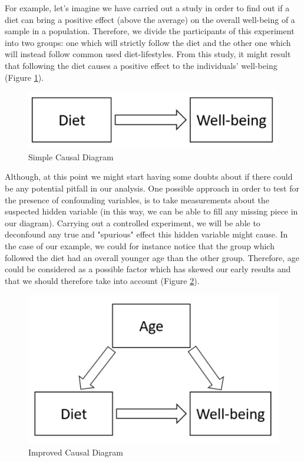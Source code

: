 For example, let's imagine we have carried out a study in order to find out if a diet can bring a positive effect (above the average) on the overall well-being of a sample in a population. Therefore, we divide the participants of this experiment into two groups: one which will strictly follow the diet and the other one which will instead follow common used diet-lifestyles. From this study, it might result that following the diet causes a positive effect to the individuals' well-being (Figure \ref{cex1}).

\begin{figure}[ht!]%
    \centering
    \includegraphics[width=0.4\linewidth]{latex/images/simple_ex.pdf}
    \vspace{-0.2cm}
    \caption{Simple Causal Diagram}
    \label{cex1}
\end{figure}
\vspace{-0.5cm}

Although, at this point we might start having some doubts about if there could be any potential pitfall in our analysis. One possible approach in order to test for the presence of confounding variables, is to take measurements about the suspected hidden variable (in this way, we can be able to fill any missing piece in our diagram). Carrying out a controlled experiment, we will be able to deconfound any true and "spurious" effect this hidden variable might cause. In the case of our example, we could for instance notice that the group which followed the diet had an overall younger age than the other group. Therefore, age could be considered as a possible factor which has skewed our early results and that we should therefore take into account (Figure \ref{cex2}).  

\begin{figure}[ht!]%
    \centering
    \includegraphics[width=0.4\linewidth]{latex/images/simple_ex2.pdf}
    \vspace{-0.2cm}
    \caption{Improved Causal Diagram}
    \label{cex2}
\end{figure}
\vspace{-0.5cm}

